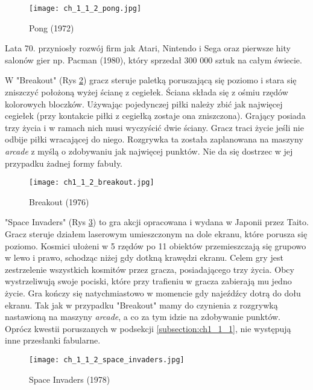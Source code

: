 \begin{figure}[h]
	\caption{Pong (1972)}
	\texttt{[image: ch\_1\_1\_2\_pong.jpg]}
	\centering
	\label{fig:ch1_1_2_pong}
\end{figure}

Lata 70. przyniosły rozwój firm jak Atari, Nintendo i Sega oraz pierwsze hity salonów
gier np. Pacman (1980), który sprzedał 300 000 sztuk na całym świecie\cite{the_evolution_of_video_games}.

W "Breakout" (Rys \ref{fig:ch1_1_2_breakout}) gracz steruje paletką poruszającą się poziomo i stara się zniszczyć położoną wyżej ścianę
z cegiełek. Ściana składa się z ośmiu rzędów kolorowych bloczków. Używając pojedynczej piłki należy
zbić jak najwięcej cegiełek (przy kontakcie piłki z cegiełką zostaje ona zniszczona). Grający posiada
trzy życia i w ramach nich musi wyczyścić dwie ściany. Gracz traci życie jeśli nie odbije piłki wracającej
do niego. Rozgrywka ta została zaplanowana na maszyny \textit{arcade} z myślą o zdobywaniu jak najwięcej
punktów. Nie da się dostrzec w jej przypadku żadnej formy fabuły.

\begin{figure}[h]
	\caption{Breakout (1976)}
	\texttt{[image: ch1\_1\_2\_breakout.jpg]}
	\centering
	\label{fig:ch1_1_2_breakout}
\end{figure}

"Space Invaders" (Rys \ref{fig:ch1_1_2_space_invaders}) to gra akcji opracowana i wydana w Japonii przez Taito. Gracz steruje działem laserowym
umieszczonym na dole ekranu, które porusza się poziomo. Kosmici ułożeni w 5 rzędów po 11 obiektów
przemieszczają się grupowo w lewo i prawo, schodząc niżej gdy dotkną krawędzi ekranu. Celem gry jest
zestrzelenie wszystkich kosmitów przez gracza, posiadającego trzy życia. Obcy wystrzeliwują swoje pociski,
które przy trafieniu w gracza zabierają mu jedno życie. Gra kończy się natychmiastowo w momencie gdy
najeźdźcy dotrą do dołu ekranu. Tak jak w przypadku "Breakout" mamy do czynienia z rozgrywką nastawioną na
maszyny \textit{arcade}, a co za tym idzie na zdobywanie punktów. Oprócz kwestii poruszanych w
podsekcji \ref{subsection:ch1_1_1}, nie występują inne przesłanki fabularne.

\begin{figure}[h]
	\caption{Space Invaders (1978)}
	\texttt{[image: ch\_1\_1\_2\_space\_invaders.jpg]}
	\centering
	\label{fig:ch1_1_2_space_invaders}
\end{figure}

